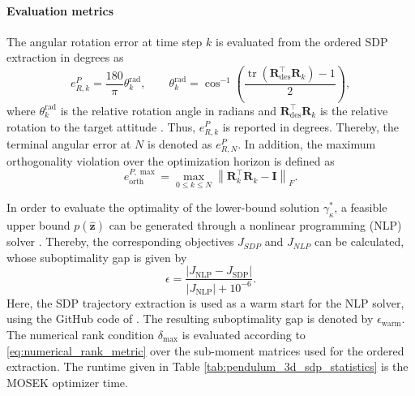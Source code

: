 \paragraph{Evaluation metrics}
The angular rotation error at time step $k$ is
evaluated from the ordered SDP extraction in degrees as
\begin{equation}
    e_{R,k}^{P}
    =
    \frac{180}{\pi}\theta_{k}^{\mathrm{rad}},
    \qquad
    \theta_{k}^{\mathrm{rad}}
    =
    \cos^{-1}\!\left(
        \frac{\operatorname{tr}(\bm R_{\mathrm{des}}^\top\bm R_k)-1}{2}
    \right),
    \label{eq:3d_pendulum_evaluation_rotation_error}
\end{equation}
where $\theta_k^{\mathrm{rad}}$ is the relative rotation angle in radians and
$\bm{R}_{\mathrm{des}}^\top \bm{R}_k$ is the relative rotation to the target attitude
\cite{GallierQuaintance2020LinearAlgebra}. Thus, $e_{R,k}^{P}$ is reported in degrees.
Thereby, the terminal angular error at $N$
is denoted as $e_{R,N}^{P}$.
In addition, the maximum orthogonality violation over the optimization horizon is defined as
\begin{equation}
    e_{\mathrm{orth}}^{P,\max}
    =\max_{0\leq k\leq N}
    \left\lVert
        \bm R_k^{\top}\bm R_k-\bm I
    \right\rVert_F.
    \label{eq:3d_pendulum_evaluation_terminal_error}
\end{equation}

In order to evaluate the optimality of the lower-bound solution $\gamma_{\kappa}^*$,
a feasible upper bound $p(\widehat{\bm{z}})$ can be generated through a
nonlinear programming (NLP) solver \cite{Sangli2025}. Thereby, the corresponding 
objectives $J_{SDP}$ and $J_{NLP}$ can be calculated, whose suboptimality gap is given by 
\begin{equation}
    \epsilon
    =
    \frac{
        \left|J_{\mathrm{NLP}}-J_{\mathrm{SDP}}\right|
    }{
        \left|J_{\mathrm{NLP}}\right|+10^{-6}
    }.
    \label{eq:3d_pendulum_warm_start_gap}
\end{equation}
Here, the SDP trajectory extraction is used as a warm start for the NLP solver,
using the GitHub code of \cite{Sangli2025}. The resulting suboptimality gap is denoted by $\epsilon_{\mathrm{warm}}$.
The numerical rank condition $\delta_{\max}$ is evaluated according to
\eqref{eq:numerical_rank_metric} over the sub-moment matrices used for the
ordered extraction. The runtime given in Table \ref{tab:pendulum_3d_sdp_statistics} 
is the MOSEK optimizer time.


